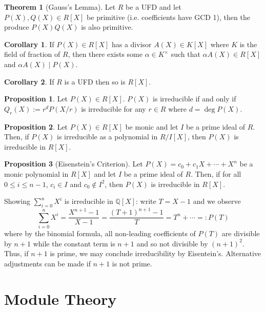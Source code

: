 \documentclass[]{article}
\theoremstyle{definition}
\newtheorem*{theorem}{Theorem}
\newtheorem*{corollary}{Corollary}
\newtheorem*{proposition}{Proposition}
\begin{document}
\begin{theorem}[Gauss's Lemma]
  Let \(R\) be a UFD and let \(P(X), Q(X) \in R[X]\) be primitive (i.e. coefficients have GCD 1), 
  then the produce \(P(X)Q(X)\) is also primitive.
\end{theorem}

\begin{corollary}
  If \(P(X) \in R[X]\) has a divisor \(A(X) \in K[X]\) where \(K\) is the field of fraction of \(R\), 
  then there exists some \(\alpha \in K^\times\) such that \(\alpha A(X) \in R[X]\) and 
  \(\alpha A(X) \mid P(X)\).
\end{corollary}

\begin{corollary}
  If \(R\) is a UFD then so is \(R[X]\).
\end{corollary}

\begin{proposition}
  Let \(P(X) \in R[X]\). \(P(X)\) is irreducible if and only if \(Q_r(X) := r^d P(X / r)\) is 
  irreducible for any \(r \in R\) where \(d = \deg P(X)\).
\end{proposition}

\begin{proposition}
  Let \(P(X) \in R[X]\) be monic and let \(I\) be a prime ideal of \(R\). Then, if 
  \(P(X)\) is irreducible as a polynomial in \(R / I[X]\), then \(P(X)\) is irreducible 
  in \(R[X]\).
\end{proposition}

\begin{proposition}[Eisenstein's Criterion]
  Let \(P(X) = c_0 + c_1X + \cdots + X^n\) be a monic polynomial in \(R[X]\) and let
  \(I\) be a prime ideal of \(R\). Then, if for all \(0 \le i \le n - 1\), 
  \(c_i \in I\) and \(c_0 \not\in I^2\), then \(P(X)\) is irreducible in \(R[X]\).
\end{proposition}

Showing \(\sum_{i = 0}^n X^i\) is irreducible in \(\mathbb{Q}[X]\): write \(T = X - 1\) and we 
observe 
\[\sum_{i = 0}^n X^i = \frac{X^{n + 1} - 1}{X - 1} = \frac{(T + 1)^{n + 1} - 1}{T} = T^n + \cdots =: P(T)\]
where by the binomial formula, all non-leading coefficients of \(P(T)\) are divisible by \(n + 1\) 
while the constant term is \(n + 1\) and so not divisible by \((n + 1)^2\). Thus, if \(n + 1\) is 
prime, we may conclude irreducibility by Eisentein's. Alternative adjustments can be made if 
\(n + 1\) is not prime.

\section*{Module Theory}
\end{document}
